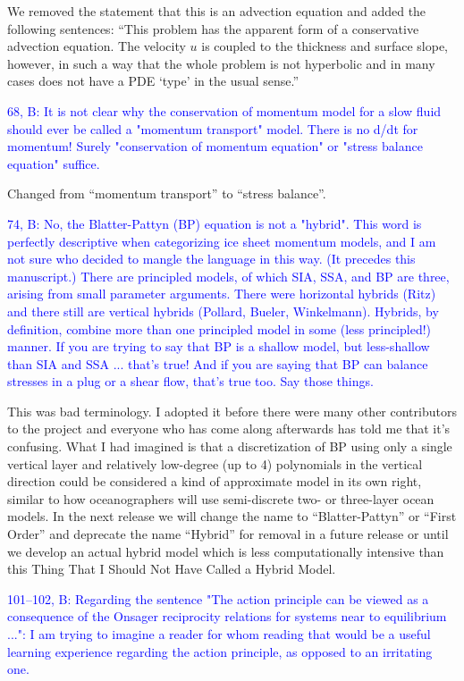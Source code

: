 \documentclass{article}
\theoremstyle{definition}
\theoremstyle{plain}
\begin{document}
We removed the statement that this is an advection equation and added the following sentences: ``This problem has the apparent form of a conservative advection equation.
The velocity $u$ is coupled to the thickness and surface slope, however, in such a way that the whole problem is not hyperbolic and in many cases does not have a PDE `type' in the usual sense.''


\textcolor{blue}{68, B:  It is not clear why the conservation of momentum model for a slow fluid should ever be called a "momentum transport" model.  There is no d/dt for momentum!  Surely "conservation of momentum equation" or "stress balance equation" suffice.}

Changed from ``momentum transport'' to ``stress balance''.

\textcolor{blue}{74, B:  No, the Blatter-Pattyn (BP) equation is not a "hybrid".  This word is perfectly descriptive when categorizing ice sheet momentum models, and I am not sure who decided to mangle the language in this way.  (It precedes this manuscript.)  There are principled models, of which SIA, SSA, and BP are three, arising from small parameter arguments.  There were horizontal hybrids (Ritz) and there still are vertical hybrids (Pollard, Bueler, Winkelmann).  Hybrids, by definition, combine more than one principled model in some (less principled!) manner.  If you are trying to say that BP is a shallow model, but less-shallow than SIA and SSA ... that's true!  And if you are saying that BP can balance stresses in a plug or a shear flow, that's true too.  Say those things.}

This was bad terminology.
I adopted it before there were many other contributors to the project and everyone who has come along afterwards has told me that it's confusing.
What I had imagined is that a discretization of BP using only a single vertical layer and relatively low-degree (up to 4) polynomials in the vertical direction could be considered a kind of approximate model in its own right, similar to how oceanographers will use semi-discrete two- or three-layer ocean models.
In the next release we will change the name to ``Blatter-Pattyn'' or ``First Order'' and deprecate the name ``Hybrid'' for removal in a future release or until we develop an actual hybrid model which is less computationally intensive than this Thing That I Should Not Have Called a Hybrid Model.

\textcolor{blue}{101--102, B:  Regarding the sentence "The action principle can be viewed as a consequence of the Onsager reciprocity relations for systems near to equilibrium ...":  I am trying to imagine a reader for whom reading that would be a useful learning experience regarding the action principle, as opposed to an irritating one.}
\end{document}

